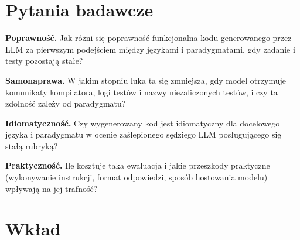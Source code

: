 \section{Pytania badawcze}
\label{sec:rqs}

\begin{rqbox}
\begin{description}[leftmargin=3.2em,labelwidth=2.8em,itemsep=3pt]
  \item[\RQ{1}] \textbf{Poprawność.} Jak różni się poprawność funkcjonalna kodu generowanego przez
    LLM za pierwszym podejściem między językami i paradygmatami, gdy zadanie i testy pozostają
    stałe?
  \item[\RQ{2}] \textbf{Samonaprawa.} W jakim stopniu luka ta się zmniejsza, gdy model otrzymuje
    komunikaty kompilatora, logi testów i nazwy niezaliczonych testów, i czy ta zdolność zależy od
    paradygmatu?
  \item[\RQ{3}] \textbf{Idiomatyczność.} Czy wygenerowany kod jest idiomatyczny dla docelowego
    języka i paradygmatu w ocenie zaślepionego sędziego LLM posługującego się stałą rubryką?
  \item[\RQ{4}] \textbf{Praktyczność.} Ile kosztuje taka ewaluacja i jakie przeszkody praktyczne
    (wykonywanie instrukcji, format odpowiedzi, sposób hostowania modelu) wpływają na jej
    trafność?
\end{description}
\end{rqbox}

\section{Wkład}

